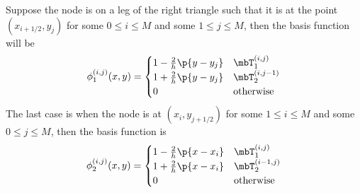 \documentclass[11pt, titlepage]{article}
\begin{document}
\begin{enumerate}
\begin{enumerate}
        Suppose the node is on a leg of the right triangle such that it is at
        the point $(x_{i+1/2}, y_j)$ for some $0 \le i \le M$ and some
        $1 \le j \le M$, then the basis function will be
        \[
          \phi^{(i, j)}_{1}(x, y) =
          \begin{cases}
            1 - \frac{2}{h}\p{y - y_j} & \mbT^{(i, j)}_1 \\
            1 + \frac{2}{h}\p{y - y_j} & \mbT^{(i, j-1)}_2 \\
            0 & \text{otherwise}
          \end{cases}
        \]
        The last case is when the node is at $(x_i, y_{j+1/2})$ for some
        $1 \le i \le M$ and some $0 \le j \le M$, then the basis function is
        \[
          \phi^{(i, j)}_{2}(x, y) =
          \begin{cases}
            1 - \frac{2}{h}\p{x - x_i} & \mbT^{(i, j)}_1 \\
            1 + \frac{2}{h}\p{x - x_i} & \mbT^{(i-1, j)}_2 \\
            0 & \text{otherwise}
          \end{cases}
        \]


\end{enumerate}
\end{enumerate}
\end{document}
